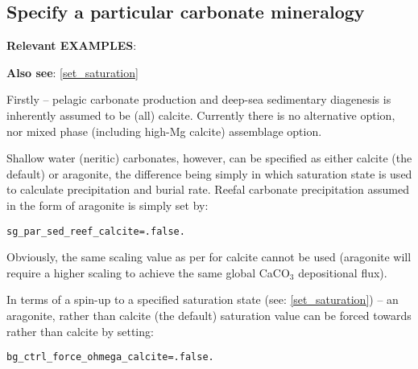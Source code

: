 \documentclass[10pt,twoside]{article}
\begin{document}

\subsection{Specify a particular carbonate mineralogy}\label{aragonite}

\noindent \textbf{Relevant EXAMPLES}: 

\noindent \textbf{Also see}: \ref{set_saturation}

\noindent Firstly -- pelagic carbonate production and deep-sea sedimentary diagenesis is inherently assumed to be (all) calcite. Currently there is no alternative option, nor mixed phase (including high-Mg calcite) assemblage option.

Shallow water (neritic) carbonates, however, can be specified as either calcite (the default) or aragonite, the difference being simply in which saturation state is used to calculate precipitation and burial rate. Reefal carbonate precipitation assumed in the form of aragonite is simply set by:
\vspace{-5pt}\begin{verbatim}
sg_par_sed_reef_calcite=.false.
\end{verbatim}\vspace{-5pt}

\noindent Obviously, the same scaling value as per for calcite cannot be used (aragonite will require a higher scaling to achieve the same global CaCO${_3}$ depositional flux).

In terms of a spin-up to a specified saturation state (see: \ref{set_saturation}) -- an aragonite, rather than calcite (the default) saturation value can be forced towards rather than calcite by setting: 
\vspace{-5pt}\begin{verbatim}
bg_ctrl_force_ohmega_calcite=.false.
\end{verbatim}\vspace{-5pt}

\end{document}
